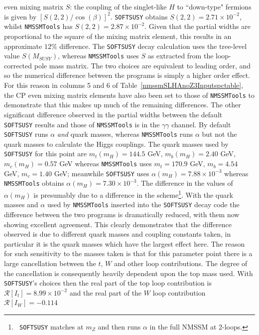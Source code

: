 \documentclass[final,3p,times]{elsarticle}
\begin{document}
even 
mixing matrix $S$: the coupling of the singlet-like $H$ to ``down-type"
fermions is given by $[S(2,2)/\cos(\beta)]^2$. {\tt SOFTSUSY}
obtains $S(2,2)
= 2.71 \times 10^{-2}$, whilst {\tt NMSSMTools} has $S(2,2) = 2.87 \times
10^{-2}$. Given that the partial widths are proportional to the square of the
mixing matrix element, this results in an approximate $12\%$ difference. 
The {\tt SOFTSUSY} decay calculation uses the tree-level value $S(M_{SUSY})$,
whereas {\tt NMSSMTools} uses $S$ as extracted from the loop-corrected pole
mass matrix. The two choices are equivalent to leading order, and so the
numerical difference between the programs is simply a higher order effect.
For
this reason in columns 5 and 6 of Table~\ref{nmssmSLHAnoZ3Inputspctable}, the
CP even mixing matrix elements have also been set to those of {\tt NMSSMTools}
to demonstrate that this makes up much of the remaining differences. The other
significant difference observed in the partial widths between the default {\tt
  SOFTSUSY} results and those of {\tt NMSSMTools} is in the $\gamma \gamma$
channel. By default {\tt SOFTSUSY} runs $\alpha$ {\em and}
quark masses, whereas {\tt NMSSMTools} runs $\alpha$
but not the quark masses to calculate the Higgs couplings. The quark masses
used by {\tt  
  SOFTSUSY} for this point are $m_t(m_{H}) = 144.5$ GeV, $m_{b}(m_{H}) =
2.40$ GeV, $m_c(m_{H}) 
= 0.57$ GeV whereas {\tt NMSSMTools} uses $m_t = 170.9$ GeV, $m_b = 4.54$ GeV,
$m_c = 1.40$ GeV; meanwhile {\tt SOFTSUSY} uses $\alpha(m_{H}) =
7.88\times10^{-3}$ whereas {\tt NMSSMTools} obtains
$\alpha(m_{H}) = 7.30\times10^{-3}$. The difference in the values of
$\alpha(m_H)$ 
is presumably due to a difference in the scheme\footnote{{\tt
  SOFTSUSY} matches at $m_Z$ and then runs $\alpha$ in the full NMSSM at
2-loops.}. With the quark masses and $\alpha$ used by {\tt NMSSMTools} inserted
into the {\tt SOFTSUSY} decay code the difference between the two programs is
dramatically reduced, with them now showing excellent agreement. 
This clearly
demonstrates that the difference observed is due to different quark masses and
coupling constants taken, in particular it is the quark masses which have the
largest effect here. The reason for such sensitivity to the masses taken is
that for this parameter point there is a large cancellation between the $t$, $W$
and other loop contributions. The degree of the cancellation is consequently
heavily dependent upon the top mass used. With {\tt SOFTSUSY}'s choices
then the real part of the top loop contribution is $\mathcal{R}[I_t] = 8.99 \times
10^{-2}$ and the real part of the $W$ loop contribution $\mathcal{R}[I_W] = -0.114$
\end{document}
